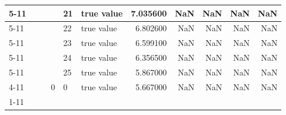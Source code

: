 \begin{tabular}{llllllrrrrr}
\cline{5-11}
 &  &  &  & 21 & true value & 7.035600 & NaN & NaN & NaN & NaN \\
\cline{5-11}
 &  &  &  & 22 & true value & 6.802600 & NaN & NaN & NaN & NaN \\
\cline{5-11}
 &  &  &  & 23 & true value & 6.599100 & NaN & NaN & NaN & NaN \\
\cline{5-11}
 &  &  &  & 24 & true value & 6.356500 & NaN & NaN & NaN & NaN \\
\cline{5-11}
 &  &  &  & 25 & true value & 5.867000 & NaN & NaN & NaN & NaN \\
\cline{4-11} \cline{5-11}
 &  &  & 0 & 0 & true value & 5.667000 & NaN & NaN & NaN & NaN \\
\cline{1-11} \cline{2-11} \cline{3-11} \cline{4-11} \cline{5-11}
\bottomrule
\end{tabular}
